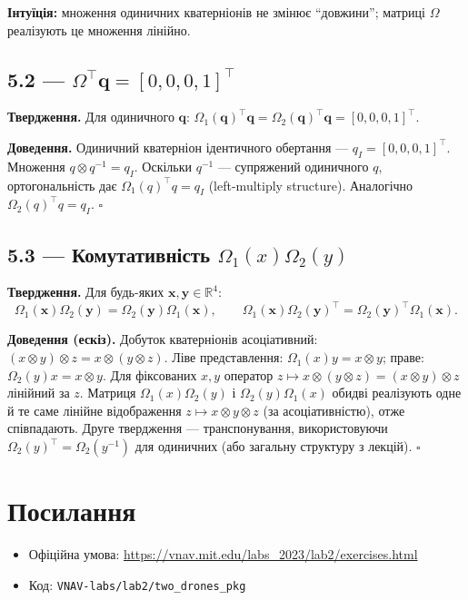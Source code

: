 \documentclass[11pt,a4paper]{article}
\newcommand{\R}{\mathbb{R}}
\begin{document}
\textbf{Інтуїція:} множення одиничних кватерніонів не змінює ``довжини''; матриці $\Omega$ реалізують це множення лінійно.

\subsection{5.2 --- \texorpdfstring{$\Omega^\top \bm{q} = [0,0,0,1]^\top$}{Omega^T q = identity}}

\textbf{Твердження.} Для одиничного $\bm{q}$: $\Omega_1(\bm{q})^\top \bm{q} = \Omega_2(\bm{q})^\top \bm{q} = [0,0,0,1]^\top$.

\textbf{Доведення.} Одиничний кватерніон ідентичного обертання --- $q_I = [0,0,0,1]^\top$.
Множення $q \otimes q^{-1} = q_I$. Оскільки $q^{-1}$ --- супряжений одиничного $q$, ортогональність дає
$\Omega_1(q)^\top q = q_I$ (left-multiply structure). Аналогічно $\Omega_2(q)^\top q = q_I$. \hfill$\square$

\subsection{5.3 --- Комутативність \texorpdfstring{$\Omega_1(x)\Omega_2(y)$}{Omega1 Omega2}}

\textbf{Твердження.} Для будь-яких $\bm{x},\bm{y}\in\R^4$:
\begin{equation}
  \Omega_1(\bm{x})\Omega_2(\bm{y}) = \Omega_2(\bm{y})\Omega_1(\bm{x}),
  \qquad
  \Omega_1(\bm{x})\Omega_2(\bm{y})^\top = \Omega_2(\bm{y})^\top\Omega_1(\bm{x}).
\end{equation}

\textbf{Доведення (ескіз).}
Добуток кватерніонів асоціативний: $(x\otimes y)\otimes z = x\otimes(y\otimes z)$.
Ліве представлення: $\Omega_1(x)y = x\otimes y$; праве: $\Omega_2(y)x = x\otimes y$.
Для фіксованих $x,y$ оператор $z \mapsto x\otimes(y\otimes z) = (x\otimes y)\otimes z$ лінійний за $z$.
Матриця $\Omega_1(x)\Omega_2(y)$ і $\Omega_2(y)\Omega_1(x)$ обидві реалізують одне й те саме лінійне відображення $z \mapsto x\otimes y \otimes z$ (за асоціативністю), отже співпадають.
Друге твердження --- транспонування, використовуючи $\Omega_2(y)^\top = \Omega_2(y^{-1})$ для одиничних (або загальну структуру з лекцій). \hfill$\square$

\section*{Посилання}

\begin{itemize}
  \item Офіційна умова: \url{https://vnav.mit.edu/labs_2023/lab2/exercises.html}
  \item Код: \texttt{VNAV-labs/lab2/two\_drones\_pkg}
\end{itemize}
\end{document}
